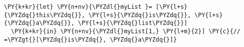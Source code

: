 \begin{Verbatim}[commandchars=\\\{\}]
\PY{k+kr}{let} \PY{n+nv}{\PYZdl{}myList }= [\PY{l+s}{\PYZdq{}this\PYZdq{}}, \PY{l+s}{\PYZdq{}is\PYZdq{}}, \PY{l+s}{\PYZdq{}a\PYZdq{}}, \PY{l+s}{\PYZdq{}list\PYZdq{}}]
  \PY{k+kr}{in} \PY{n+nv}{\PYZdl{}myList[1,} \PY{l+m}{2}] \PY{c}{// =\PYZgt{}[\PYZdq{}is\PYZdq{}, \PYZdq{}a\PYZdq{}]}
\end{Verbatim}
